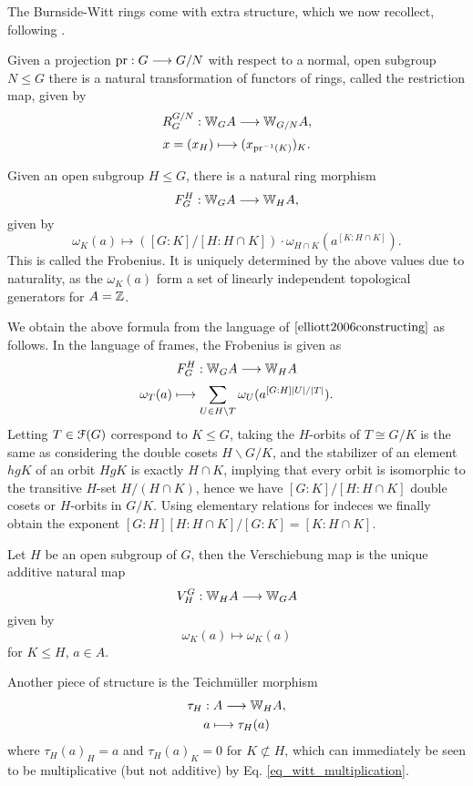 %
%
The Burnside-Witt rings come with extra structure, which we now recollect, following \cite{elliott2006constructing}.\\
\begin{defn}\label{def_witt_res}
Given a projection $\operatorname{pr}: G \longrightarrow G/N$ with respect to a normal, open subgroup $N \leq G$ there is a natural transformation of functors of rings, called the restriction map, given by
\[	R_G^{G/N}: \mathbb{W}_G A \longrightarrow \mathbb{W}_{G/N} A,\]
\[	x = (x_H) \longmapsto (x_{\operatorname{pr}^{-1}(K)})_K.	\]
\end{defn}
\begin{defn}\label{def_witt_frob}
Given an open subgroup $H \leq G$, there is a natural ring morphism
\[	F_G^H: \mathbb{W}_G A \longrightarrow \mathbb{W}_H A, \]
given by
\[	\omega_K(a) \mapsto ( [G:K]/[H: H \cap K]) \cdot \omega_{H \cap K} (a^{[K : H \cap K]}).	\]
This is called the Frobenius.  It is uniquely determined by the above values due to naturality, as the $\omega_K(a)$ form a set of linearly independent topological generators for $A = \mathbb{Z}$.
\end{defn}
\begin{rem}
We obtain the above formula from the language of $\cite{elliott2006constructing}$ as follows. In the language of frames, the Frobenius is given as
\[	F_G^H: \mathbb{W}_G A \longrightarrow \mathbb{W}_H A	\]
\[	\omega_T(a) \longmapsto \sum_{U \in H \backslash T} \omega_U( a^{ [G:H] \left\vert U\right\vert / \left\vert T\right\vert } ).\]
Letting $T \in \mathcal{F}(G)$ correspond to $K \leq G$, taking the $H$-orbits of $T \cong G/K$ is the same as considering the double cosets $H \backslash G / K$, and the stabilizer of an element $hgK$ of an orbit $HgK$ is exactly $H \cap K$, implying that every orbit is isomorphic to the transitive $H$-set $H/(H \cap K)$, hence we have $[G:K]/[H: H \cap K]$ double cosets or $H$-orbits in $G/K$. Using elementary relations for indeces we finally obtain the exponent $[G:H] [H:H \cap K] / [G:K] = [K : H \cap K]$.
\end{rem}
\begin{defn}\label{def_witt_vers}
Let $H$ be an open subgroup of $G$, then the Verschiebung map is the unique additive natural map
	\[	V_H^G : \mathbb{W}_H A \longrightarrow \mathbb{W}_G A \]
given by
	\[ \omega_K (a) \mapsto \omega_K (a) \]
for $K \leq H$, $a \in A$.
\end{defn}
%
%
\begin{defn}\label{def_teichmueller_burnside_witt_vectors}
Another piece of structure is the Teichm\"uller morphism
\begin{gather*}
	\tau_H: A \to \bW_H A,\\%
	a \mapsto \tau_H(a)
\end{gather*}
where $\tau_H(a)_H = a$ and $\tau_H(a)_K = 0$ for $K \not\subset H$, which can immediately be seen to be multiplicative (but not additive) by Eq. \ref{eq_witt_multiplication}.
\end{defn}
